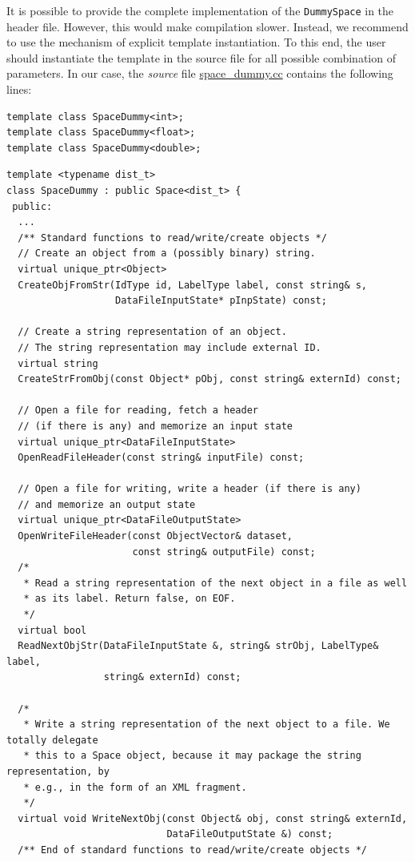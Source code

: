 \documentclass[runningheads,a4paper]{llncs}
\newcommand{\replocfile}{https://github.com/searchivarius/NonMetricSpaceLib/blob/pserv/}
\newcommand{\ttt}[1]{\texttt{#1}}
\begin{document}
It is possible to provide the complete implementation of the \ttt{DummySpace}
in the header file. However, this would make compilation slower.
Instead, we recommend to use the mechanism of explicit template instantiation.
To this end, the user should instantiate the template in the source file
for all possible combination of parameters.
In our case, the \emph{source} file 
\href{\replocfile similarity_search/src/space/space_dummy.cc}{space\_dummy.cc}
contains the following lines:
\begin{verbatim}
template class SpaceDummy<int>;
template class SpaceDummy<float>;
template class SpaceDummy<double>;
\end{verbatim}

\begin{table}[[!htbp]
\caption{\label{FigDummySpace}A sample space class}
\begin{verbatim}
template <typename dist_t>
class SpaceDummy : public Space<dist_t> {
 public:
  ...
  /** Standard functions to read/write/create objects */ 
  // Create an object from a (possibly binary) string.
  virtual unique_ptr<Object> 
  CreateObjFromStr(IdType id, LabelType label, const string& s,
                   DataFileInputState* pInpState) const;

  // Create a string representation of an object.
  // The string representation may include external ID.
  virtual string 
  CreateStrFromObj(const Object* pObj, const string& externId) const;

  // Open a file for reading, fetch a header 
  // (if there is any) and memorize an input state
  virtual unique_ptr<DataFileInputState> 
  OpenReadFileHeader(const string& inputFile) const;

  // Open a file for writing, write a header (if there is any) 
  // and memorize an output state
  virtual unique_ptr<DataFileOutputState> 
  OpenWriteFileHeader(const ObjectVector& dataset,
                      const string& outputFile) const;
  /*
   * Read a string representation of the next object in a file as well
   * as its label. Return false, on EOF.
   */
  virtual bool 
  ReadNextObjStr(DataFileInputState &, string& strObj, LabelType& label, 
                 string& externId) const;

  /* 
   * Write a string representation of the next object to a file. We totally delegate
   * this to a Space object, because it may package the string representation, by
   * e.g., in the form of an XML fragment.
   */
  virtual void WriteNextObj(const Object& obj, const string& externId, 
                            DataFileOutputState &) const;
  /** End of standard functions to read/write/create objects */ 


\end{verbatim}
\end{table}
\end{document}
